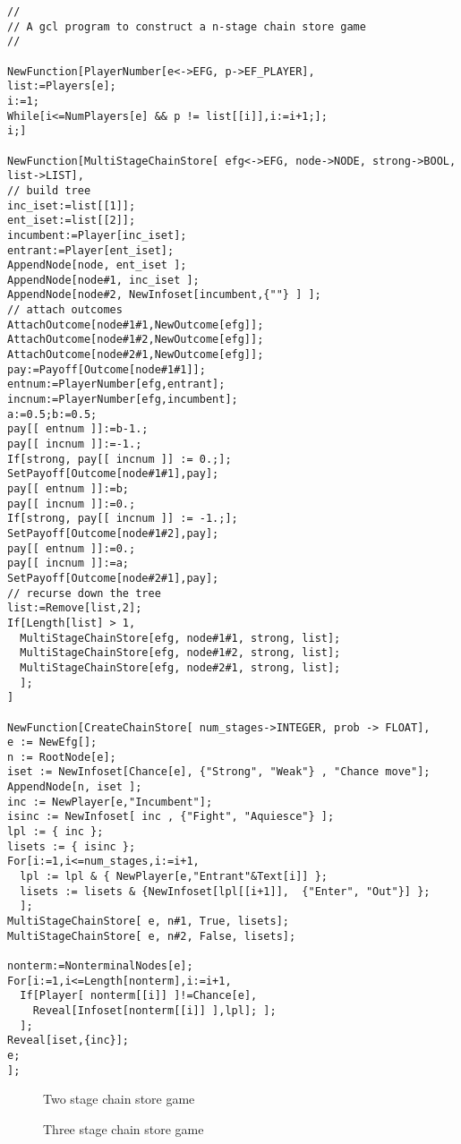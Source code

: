 \begin{verbatim}
//
// A gcl program to construct a n-stage chain store game
//

NewFunction[PlayerNumber[e<->EFG, p->EF_PLAYER],
list:=Players[e];
i:=1;
While[i<=NumPlayers[e] && p != list[[i]],i:=i+1;];
i;]

NewFunction[MultiStageChainStore[ efg<->EFG, node->NODE, strong->BOOL, list->LIST],
// build tree
inc_iset:=list[[1]];
ent_iset:=list[[2]];
incumbent:=Player[inc_iset];
entrant:=Player[ent_iset];
AppendNode[node, ent_iset ];
AppendNode[node#1, inc_iset ];
AppendNode[node#2, NewInfoset[incumbent,{""} ] ];
// attach outcomes 
AttachOutcome[node#1#1,NewOutcome[efg]];
AttachOutcome[node#1#2,NewOutcome[efg]];
AttachOutcome[node#2#1,NewOutcome[efg]];
pay:=Payoff[Outcome[node#1#1]];
entnum:=PlayerNumber[efg,entrant];
incnum:=PlayerNumber[efg,incumbent];
a:=0.5;b:=0.5;
pay[[ entnum ]]:=b-1.;
pay[[ incnum ]]:=-1.;
If[strong, pay[[ incnum ]] := 0.;];
SetPayoff[Outcome[node#1#1],pay];
pay[[ entnum ]]:=b;
pay[[ incnum ]]:=0.;
If[strong, pay[[ incnum ]] := -1.;];
SetPayoff[Outcome[node#1#2],pay];
pay[[ entnum ]]:=0.;
pay[[ incnum ]]:=a;
SetPayoff[Outcome[node#2#1],pay];
// recurse down the tree
list:=Remove[list,2];
If[Length[list] > 1,
  MultiStageChainStore[efg, node#1#1, strong, list];
  MultiStageChainStore[efg, node#1#2, strong, list];
  MultiStageChainStore[efg, node#2#1, strong, list];
  ];
]

NewFunction[CreateChainStore[ num_stages->INTEGER, prob -> FLOAT],
e := NewEfg[];
n := RootNode[e];
iset := NewInfoset[Chance[e], {"Strong", "Weak"} , "Chance move"];
AppendNode[n, iset ];
inc := NewPlayer[e,"Incumbent"];
isinc := NewInfoset[ inc , {"Fight", "Aquiesce"} ];
lpl := { inc };
lisets := { isinc }; 
For[i:=1,i<=num_stages,i:=i+1,
  lpl := lpl & { NewPlayer[e,"Entrant"&Text[i]] };
  lisets := lisets & {NewInfoset[lpl[[i+1]],  {"Enter", "Out"}] };
  ];
MultiStageChainStore[ e, n#1, True, lisets];
MultiStageChainStore[ e, n#2, False, lisets];

nonterm:=NonterminalNodes[e];
For[i:=1,i<=Length[nonterm],i:=i+1,
  If[Player[ nonterm[[i]] ]!=Chance[e],
    Reveal[Infoset[nonterm[[i]] ],lpl]; ];
  ];	
Reveal[iset,{inc}];
e;
];

\end{verbatim}

\newpage
\begin{figure}[h]
\centerline{}
\caption{Two stage chain store game}
\end{figure}

\newpage
\begin{figure}[h]
\centerline{}
\caption{Three stage chain store game}
\end{figure}

